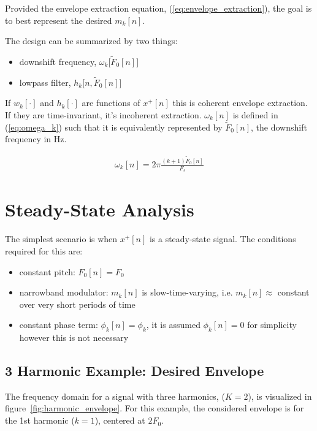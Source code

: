 \documentclass [11pt, proquest,oneside] {ganter_thesis}[2015/03/03]
\begin{document}
Provided the envelope extraction equation, (\ref{eq:envelope_extraction}), the goal is to best represent the desired $m_k[n]$.

The design can be summarized by two things:

\begin{itemize}
\item downshift frequency, $\omega_k\big[\tilde{F}_0[n]\big]$
\item lowpass filter, $h_k\big[n,\tilde{F}_0[n]\big]$
\end{itemize}

If $w_k[\cdot]$ and $h_k[\cdot]$ are functions of $x^+[n]$ this is coherent envelope extraction.  If they are time-invariant, it's incoherent extraction.  $\omega_k[n]$ is defined in (\ref{eq:omega_k}) such that it is equivalently represented by $\tilde{F}_0[n]$, the downshift frequency in Hz.

\begin{align}
\label{eq:omega_k}
\omega_k[n] = 2\pi \frac{(k+1)\tilde{F}_0[n]}{F_s}
\end{align}

\section{Steady-State Analysis}

The simplest scenario is when $x^+[n]$ is a steady-state signal.  The conditions required for this are:

\begin{itemize}
\item constant pitch: $F_0[n] = F_0$
\item narrowband modulator: $m_k[n]$ is slow-time-varying, i.e. $m_k[n] \approx$ constant over very short periods of time
\item constant phase term: $\phi_k[n] = \phi_k$, it is assumed $\phi_k[n] = 0$ for simplicity however this is not necessary
\end{itemize}

\subsection{3 Harmonic Example: Desired Envelope}

The frequency domain for a signal with three harmonics, ($K = 2$), is visualized in figure~\ref{fig:harmonic_envelope}.  For this example, the considered envelope is for the 1st harmonic ($k = 1$), centered at $2F_0$.
\end{document}
